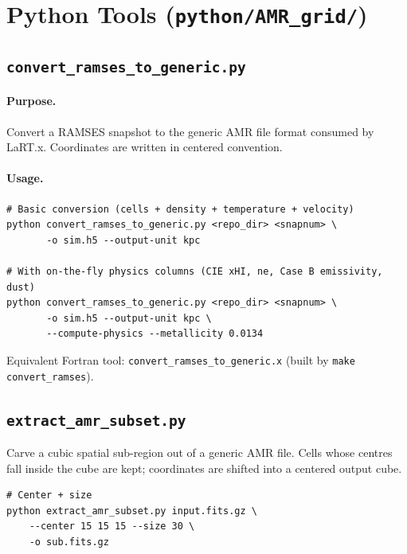 \documentclass[english,a4paper]{my_memo}
\begin{document}
\section{Python Tools (\texttt{python/AMR\_grid/})}

\subsection{\texttt{convert\_ramses\_to\_generic.py}}

\paragraph{Purpose.} Convert a RAMSES snapshot to the generic AMR file
format consumed by LaRT.x.  Coordinates are written in centered
convention.

\paragraph{Usage.}
\begin{lstlisting}[style=shellstyle]
# Basic conversion (cells + density + temperature + velocity)
python convert_ramses_to_generic.py <repo_dir> <snapnum> \
       -o sim.h5 --output-unit kpc

# With on-the-fly physics columns (CIE xHI, ne, Case B emissivity, dust)
python convert_ramses_to_generic.py <repo_dir> <snapnum> \
       -o sim.h5 --output-unit kpc \
       --compute-physics --metallicity 0.0134
\end{lstlisting}

Equivalent Fortran tool: \texttt{convert\_ramses\_to\_generic.x}
(built by \texttt{make convert\_ramses}).

\subsection{\texttt{extract\_amr\_subset.py}}

Carve a cubic spatial sub-region out of a generic AMR file.  Cells
whose centres fall inside the cube are kept; coordinates are shifted
into a centered output cube.

\begin{lstlisting}[style=shellstyle]
# Center + size
python extract_amr_subset.py input.fits.gz \
    --center 15 15 15 --size 30 \
    -o sub.fits.gz
\end{lstlisting}
\end{document}
